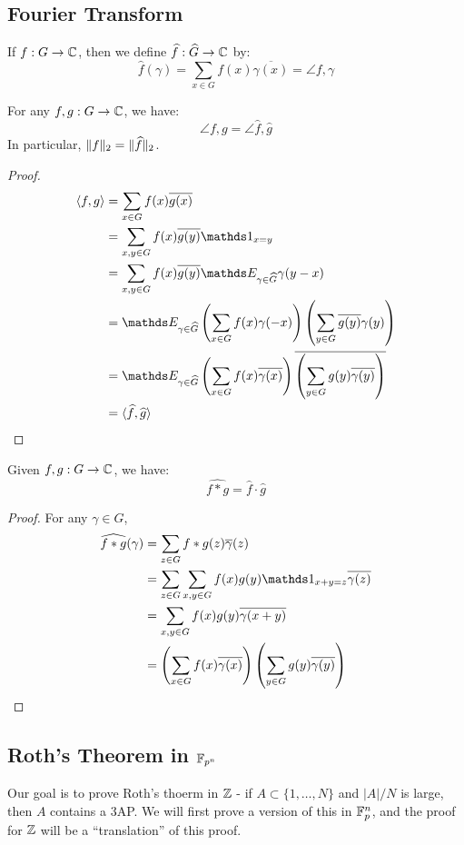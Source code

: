 \documentclass[10pt,a4paper]{article}
\begin{document}
\subsection{Fourier Transform}
If $f: G \to \mathbb{C}$, then we define $\widehat{f} : \widehat{G} \to \mathbb{C}$ by:
\[\hat{f}(\gamma) = \sum_{x\in G} f(x)\overline{\gamma(x)} = \angle{f, \gamma}\]
\begin{lemma}
  For any $f, g : G \to \mathbb{C}$, we have:
  \[\angle{f, g} = \angle{\hat{f}, \hat{g}}\]
  In particular, $\lVert f\rVert_2 = \lVert\widehat{f}\rVert_2$.
\end{lemma}
\begin{proof}
  \begin{align*}
    \angle{f,g} &= \sum_{x\in G} f(x) \overline{g(x)}\\
    &= \sum_{x,y \in G}f(x)\overline{g(y)}\one_{x=y}\\
    &= \sum_{x,y \in G}f(x)\overline{g(y)}\E_{\gamma \in \hat{G}}\gamma(y-x)\\
    &= \E_{\gamma \in \hat{G}}\left(\sum_{x\in G}f(x)\gamma(-x)\right)\left(\sum_{y\in G}\overline{g(y)}\gamma(y)\right)\\
    &= \E_{\gamma \in \hat{G}}\left(\sum_{x\in G} f(x)\overline{\gamma(x)}\right)\overline{\left(\sum_{y\in G} g(y)\overline{\gamma(y)}\right)}\\
    &= \angle{\hat{f}, \hat{g}}
  \end{align*}
\end{proof}
\begin{lemma}
  Given $f, g:G \to \mathbb{C}$, we have:
  \[\widehat{f\ast g} = \hat{f}\cdot \hat{g}\]
\end{lemma}
\begin{proof}
  For any $\gamma \in \hat{G}$,
  \begin{align*}
    \widehat{f\ast g}(\gamma) &= \sum_{z\in G} f\ast g(z) \overline{\gamma}(z)\\
    &= \sum_{z\in G}\sum_{x,y \in G} f(x) g(y) \one_{x+y=z}\overline{\gamma(z)}\\
    &= \sum_{x,y \in G} f(x)g(y)\overline{\gamma(x+y)}\\
    &= \left(\sum_{x\in G}f(x)\overline{\gamma(x)}\right)\left(\sum_{y \in G}g(y)\overline{\gamma(y)}\right)
  \end{align*}
\end{proof}
\subsection{Roth's Theorem in $\mathbb{F}_{p^n}$}
Our goal is to prove Roth's thoerm in $\mathbb{Z}$ - if $A \subset \{1, \ldots, N\}$ and $|A|/N$ is large, then $A$ contains a 3AP. We will first prove a version of this in $\mathbb{F}_p^n$, and the proof for $\mathbb{Z}$ will be a ``translation'' of this proof.
\end{document}
